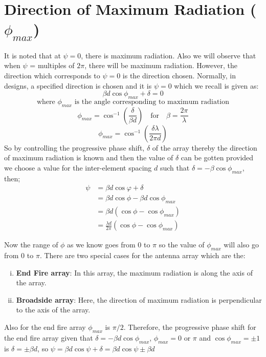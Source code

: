 \section{Direction of Maximum Radiation ($\phi_{max}$)}
It is noted that at $\psi = 0$, there is maximum radiation. Also we will observe that when $\psi$ = multiples of $2\pi$, there will be maximum radiation. However, the direction which corresponds to $\psi = 0$ is the direction chosen. Normally, in designs, a specified direction is chosen and it is $\psi = 0$ which we recall is given as:
$$
\beta d\cos {\phi_{max}} + \delta = 0 
$$
$$
\text{where $\phi_{max}$ is the angle corresponding to maximum radiation}
$$
$$\phi_{max} = \cos^{-1}{(\frac{\delta}{\beta d})} \quad \text{for} \quad \beta = \frac{2\pi}{\lambda} $$
$$\phi_{max} = \cos^{-1}{(\frac{\delta \lambda}{2\pi d})}  $$
So by controlling the progressive phase shift, $\delta$ of the array thereby the direction of maximum radiation is known and then the value of $\delta$ can be gotten provided we choose a value for the inter-element spacing $d$ such that $\delta = -\beta \cos{\phi_{max}}$, then;
\begin{align}
\psi &=\beta d \cos {\varphi} + \delta \\
&=\beta d \cos{\phi} - \beta d \cos{\phi_{max}} \\
\label{36}
&=\beta d (\cos{\phi} - \cos{\phi_{max}}) \\
&=\frac{\lambda d}{2\pi}(\cos{\phi} - \cos{\phi_{max}})
\end{align}


Now the range of $\phi$ as we know goes from $0$ to $\pi$ so the value of $\phi_{max}$ will also go from $0$ to $\pi$.
There are two special cases for the antenna array which are the:
\begin{enumerate}[(i)]
\item \textbf{End Fire array}: In this array, the maximum radiation is along the axis of the array. 
\item \textbf{Broadside array}: Here, the direction of maximum radiation is perpendicular to the axis of the array.
\end{enumerate}

Also for the end fire array $\phi_{max}$ is $\pi/2$. Therefore, the progressive phase shift for the end fire array given that $\delta = -\beta d\cos{\phi_{max}}$, $\phi_{max}=0$ or $\pi$ and $\cos{\phi_{max}} = \pm 1$ is $\delta = \pm \beta d$, so $\psi = \beta d \cos{\psi} + \delta = \beta d \cos{\psi} \pm \beta d $


